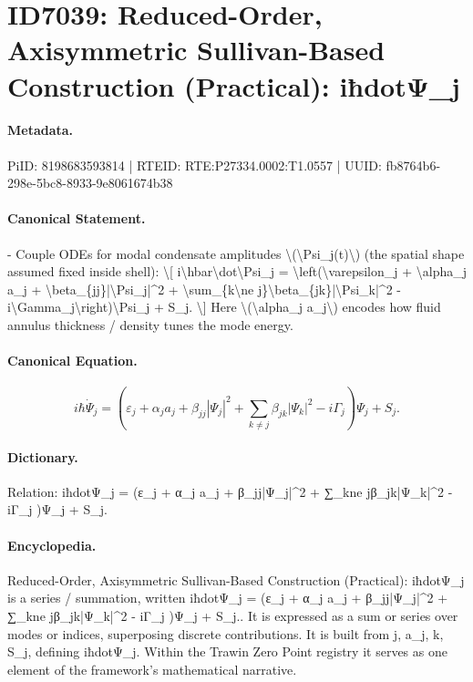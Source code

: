 \section*{ID7039: Reduced-Order, Axisymmetric Sullivan-Based Construction (Practical): iħdotΨ\_j}
\paragraph{Metadata.}
PiID: 8198683593814 | RTEID: RTE:P27334.0002:T1.0557 | UUID: fb8764b6-298e-5bc8-8933-9e8061674b38

\paragraph{Canonical Statement.}
- Couple ODEs for modal condensate amplitudes \textbackslash{}(\textbackslash{}Psi\_j(t)\textbackslash{}) (the spatial shape assumed fixed inside shell): \textbackslash{}[ i\textbackslash{}hbar\textbackslash{}dot\textbackslash{}Psi\_j = \textbackslash{}left(\textbackslash{}varepsilon\_j + \textbackslash{}alpha\_j a\_j + \textbackslash{}beta\_\{jj\}|\textbackslash{}Psi\_j|\textasciicircum{}2 + \textbackslash{}sum\_\{k\textbackslash{}ne j\}\textbackslash{}beta\_\{jk\}|\textbackslash{}Psi\_k|\textasciicircum{}2 - i\textbackslash{}Gamma\_j\textbackslash{}right)\textbackslash{}Psi\_j + S\_j. \textbackslash{}] Here \textbackslash{}(\textbackslash{}alpha\_j a\_j\textbackslash{}) encodes how fluid annulus thickness / density tunes the mode energy.

\paragraph{Canonical Equation.}
\[
i\hbar\dot\Psi_j = \left(\varepsilon_j + \alpha_j a_j + \beta_{jj}|\Psi_j|^2 + \sum_{k\ne j}\beta_{jk}|\Psi_k|^2 - i\Gamma_j\right)\Psi_j + S_j.
\]

\paragraph{Dictionary.}
Relation: iħdotΨ\_j = (ε\_j + α\_j a\_j + β\_jj|Ψ\_j|\textasciicircum{}2 + ∑\_kne jβ\_jk|Ψ\_k|\textasciicircum{}2 - iΓ\_j )Ψ\_j + S\_j.

\paragraph{Encyclopedia.}
Reduced-Order, Axisymmetric Sullivan-Based Construction (Practical): iħdotΨ\_j is a series / summation, written iħdotΨ\_j = (ε\_j + α\_j a\_j + β\_jj|Ψ\_j|\textasciicircum{}2 + ∑\_kne jβ\_jk|Ψ\_k|\textasciicircum{}2 - iΓ\_j )Ψ\_j + S\_j.. It is expressed as a sum or series over modes or indices, superposing discrete contributions. It is built from j, a\_j, k, S\_j, defining iħdotΨ\_j. Within the Trawin Zero Point registry it serves as one element of the framework's mathematical narrative.
